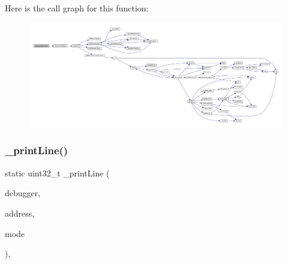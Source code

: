 Here is the call graph for this function\+:
\nopagebreak
\begin{figure}[H]
\begin{center}
\leavevmode
\includegraphics[width=350pt]{arm_2debugger_2cli-debugger_8c_ae4976961ac2fc2199fc3fd2ad59f368c_cgraph}
\end{center}
\end{figure}
\mbox{\label{arm_2debugger_2cli-debugger_8c_a1e0fedf60889558dc8c188a2ac725c88}} 
\subsubsection{\texorpdfstring{\+\_\+print\+Line()}{\_printLine()}}
{\footnotesize\ttfamily static uint32\+\_\+t \+\_\+print\+Line (\begin{DoxyParamCaption}\item[{struct C\+L\+I\+Debugger $\ast$}]{debugger,  }\item[{uint32\+\_\+t}]{address,  }\item[{enum Execution\+Mode}]{mode }\end{DoxyParamCaption})\hspace{0.3cm}{\ttfamily [inline]}, {\ttfamily [static]}}

